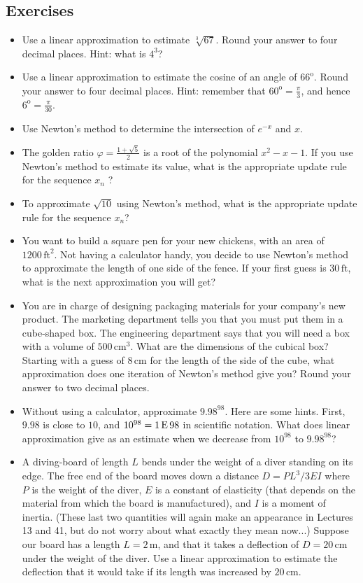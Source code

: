 \documentclass[twoside,openright,titlepage,a4paper]{book}
\begin{document}
\begin{sloppypar}
\subsection{Exercises}
\begin{itemize}
\item Use a linear approximation to estimate $\sqrt[3]{67}$. Round your answer to four decimal places. Hint: what is $4^3$?
\item Use a linear approximation to estimate the cosine of an angle of $66^\mathrm{o}$. Round your answer to four decimal places. Hint: remember that $\displaystyle 60^\mathrm{o} = \frac{\pi}{3}$, and hence $\displaystyle 6^\mathrm{o} = \frac{\pi}{30}$.
\item Use Newton's method to determine the intersection of $e^{-x}$ and $x$.
\item The golden ratio $\displaystyle \varphi = \frac{1+\sqrt{5}}{2}$ is a root of the polynomial $x^2-x-1$. If you use Newton's method to estimate its value, what is the appropriate update rule for the sequence $x_n$ ?
\item To approximate $\sqrt{10}$ using Newton's method, what is the appropriate update rule for the sequence $x_n$?
\item You want to build a square pen for your new chickens, with an area of $1200\,\mathrm{ft}^2$. Not having a calculator handy, you decide to use Newton's method to approximate the length of one side of the fence. If your first guess is $30\,\mathrm{ft}$, what is the next approximation you will get?
\item You are in charge of designing packaging materials for your company's new product. The marketing department tells you that you must put them in a cube-shaped box. The engineering department says that you will need a box with a volume of $500\,\mathrm{cm}^3$. What are the dimensions of the cubical box? Starting with a guess of $8\,\mathrm{cm}$ for the length of the side of the cube, what approximation does one iteration of Newton's method give you? Round your answer to two decimal places.
\item Without using a calculator, approximate $9.98^{98}$. Here are some hints. First, $9.98$ is close to $10$, and $10^{98}=1\,{\rm E}\,98$ in scientific notation. What does linear approximation give as an estimate when we decrease from $10^{98}$ to $9.98^{98}$?
\item A diving-board of length $L$ bends under the weight of a diver standing on its edge. The free end of the board moves down a distance $D = PL^3/3EI $ where $P$ is the weight of the diver, $E$ is a constant of elasticity (that depends on the material from which the board is manufactured), and $I$ is a moment of inertia. (These last two quantities will again make an appearance in Lectures 13 and 41, but do not worry about what exactly they mean now...) Suppose our board has a length $L = 2\,\mathrm{m}$, and that it takes a deflection of $D = 20\,\mathrm{cm}$ under the weight of the diver. Use a linear approximation to estimate the deflection that it would take if its length was increased by $20\,\mathrm{cm}$.
\end{itemize}		


\end{sloppypar}
\end{document}
